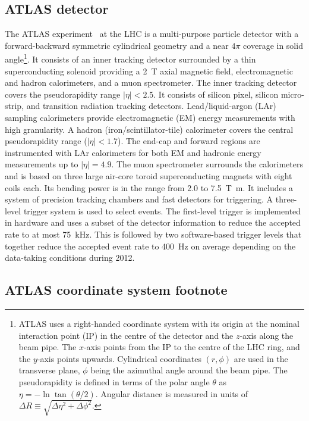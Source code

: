 \newcommand{\AtlasCoordFootnote}{%
ATLAS uses a right-handed coordinate system with its origin at the nominal interaction point (IP)
in the centre of the detector and the $z$-axis along the beam pipe.
The $x$-axis points from the IP to the centre of the LHC ring,
and the $y$-axis points upwards.
Cylindrical coordinates $(r,\phi)$ are used in the transverse plane, 
$\phi$ being the azimuthal angle around the beam pipe.
The pseudorapidity is defined in terms of the polar angle $\theta$ as $\eta = -\ln \tan(\theta/2)$.
Angular distance is measured in units of $\Delta R \equiv \sqrt{\Delta\eta^{2} + \Delta\phi^{2}}$.}

\subsection{ATLAS detector}
\label{sec:atlas1}

The ATLAS experiment~\cite{atlas-detector} at the LHC is a multi-purpose particle detector
with a forward-backward symmetric cylindrical geometry and a near $4\pi$ coverage in 
solid angle\footnote{\AtlasCoordFootnote}.
It consists of an inner tracking detector surrounded by a thin superconducting solenoid
providing a \SI{2}{\tesla} axial magnetic field, electromagnetic and hadron calorimeters, and a muon spectrometer.
The inner tracking detector covers the pseudorapidity range $|\eta| < 2.5$.
It consists of silicon pixel, silicon micro-strip, and transition radiation tracking detectors.
Lead/liquid-argon (LAr) sampling calorimeters provide electromagnetic (EM) energy measurements
with high granularity.
A hadron (iron/scintillator-tile) calorimeter covers the central pseudorapidity range ($|\eta| < 1.7$).
The end-cap and forward regions are instrumented with LAr calorimeters
for both EM and hadronic energy measurements up to $|\eta| = 4.9$.
The muon spectrometer surrounds the calorimeters and is based on
three large air-core toroid superconducting magnets with eight coils each.
Its bending power is in the range from \num{2.0} to \SI{7.5}{\tesla\metre}.
It includes a system of precision tracking chambers and fast detectors for triggering.
A three-level trigger system is used to select events.
The first-level trigger is implemented in hardware and uses a subset of the detector information
to reduce the accepted rate to at most \SI{75}{\kilo\hertz}.
This is followed by two software-based trigger levels that
together reduce the accepted event rate to \SI{400}{\hertz} on average
depending on the data-taking conditions during 2012.


\subsection{ATLAS coordinate system footnote}
\label{sec:coord}


